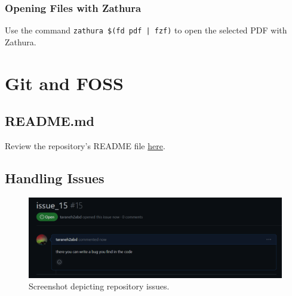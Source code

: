 \documentclass[12pt]{article}
\begin{document}
\subsubsection{Opening Files with Zathura}
    Use the command \texttt{zathura \$(fd pdf | fzf)} to open the selected PDF with Zathura.

\section{Git and FOSS}
\subsection{README.md}
Review the repository's README file \href{https://github.com/sarbaz14/latex/blob/master/README.md}{here}.

\subsection{Handling Issues}
\begin{figure}[!h]
    \centering
    \includegraphics[width=1\textwidth]{issues.png}
    \caption{Screenshot depicting repository issues.}
\end{figure}
\end{document}
